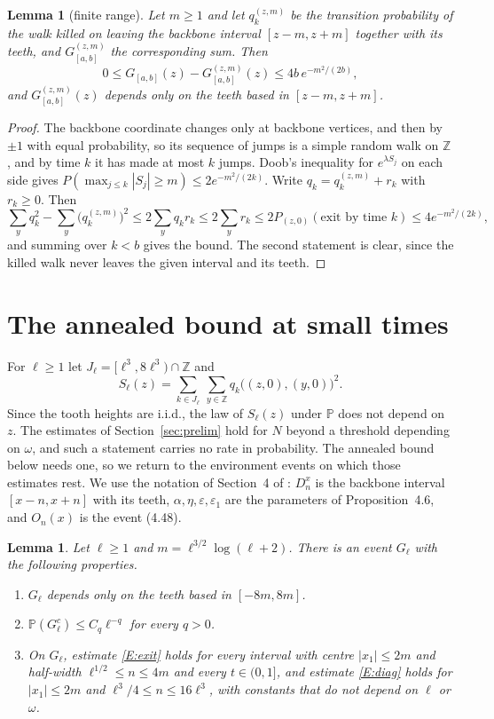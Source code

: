 \documentclass[11pt]{amsart}
\newtheorem{lemma}[theorem]{Lemma}
\theoremstyle{remark}
\numberwithin{equation}{section}
\newcommand{\PP}{\mathbb{P}}
\newcommand{\Z}{\mathbb{Z}}
\begin{document}
\begin{lemma}[finite range]\label{lem:range}
Let $m\ge1$ and let $q^{(z,m)}_k$ be the transition probability of the walk killed on leaving the backbone interval $[z-m,z+m]$ together with its teeth, and $G^{(z,m)}_{[a,b]}$ the corresponding sum. Then
\[
0\le G_{[a,b]}(z)-G^{(z,m)}_{[a,b]}(z)\le 4b\,e^{-m^2/(2b)},
\]
and $G^{(z,m)}_{[a,b]}(z)$ depends only on the teeth based in $[z-m,z+m]$.
\end{lemma}

\begin{proof}
The backbone coordinate changes only at backbone vertices, and then by $\pm1$ with equal probability, so its sequence of jumps is a simple random walk on $\Z$, and by time $k$ it has made at most $k$ jumps. Doob's inequality for $e^{\lambda S_j}$ on each side gives $P(\max_{j\le k}|S_j|\ge m)\le 2e^{-m^2/(2k)}$. Write $q_k=q^{(z,m)}_k+r_k$ with $r_k\ge0$. Then
\[
\sum_y q_k^2-\sum_y\bigl(q^{(z,m)}_k\bigr)^2\le 2\sum_y q_k r_k\le 2\sum_y r_k\le 2P_{(z,0)}(\text{exit by time }k)\le 4e^{-m^2/(2k)},
\]
and summing over $k<b$ gives the bound. The second statement is clear, since the killed walk never leaves the given interval and its teeth.
\end{proof}

\section{The annealed bound at small times}\label{sec:lemmaA}
For $\ell\ge1$ let $J_\ell=[\ell^3,8\ell^3)\cap\Z$ and
\[
S_\ell(z)=\sum_{k\in J_\ell}\ \sum_{y\in\Z}q_k\bigl((z,0),(y,0)\bigr)^2 .
\]
Since the tooth heights are i.i.d., the law of $S_\ell(z)$ under $\PP$ does not depend on $z$. The estimates of Section~\ref{sec:prelim} hold for $N$ beyond a threshold depending on $\omega$, and such a statement carries no rate in probability. The annealed bound below needs one, so we return to the environment events on which those estimates rest. We use the notation of Section~4 of \cite{DNNS}: $D^x_n$ is the backbone interval $[x-n,x+n]$ with its teeth, $\alpha,\eta,\varepsilon,\varepsilon_1$ are the parameters of Proposition~4.6, and $O_n(x)$ is the event (4.48).

\begin{lemma}\label{lem:A0}
Let $\ell\ge1$ and $m=\ell^{3/2}\log(\ell+2)$. There is an event $G_\ell$ with the following properties.
\begin{enumerate}[label=(\roman*),leftmargin=*]
\item $G_\ell$ depends only on the teeth based in $[-8m,8m]$.
\item $\PP(G_\ell^c)\le C_q\ell^{-q}$ for every $q>0$.
\item On $G_\ell$, estimate \ref{E:exit} holds for every interval with centre $|x_1|\le2m$ and half-width $\ell^{1/2}\le n\le4m$ and every $t\in(0,1]$, and estimate \ref{E:diag} holds for $|x_1|\le2m$ and $\ell^3/4\le n\le16\ell^3$, with constants that do not depend on $\ell$ or $\omega$.
\end{enumerate}
\end{lemma}
\end{document}
